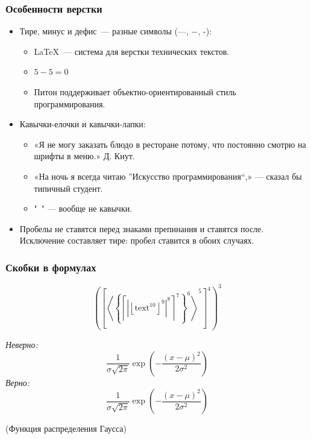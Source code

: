 \documentclass{beamer}
\begin{document}
\begin{frame}
  \frametitle{Особенности верстки}

  \begin{itemize}  
  \item Тире, минус и дефис~— разные символы (—, $-$, -):
    \begin{itemize}
    \item \LaTeX~— система для верстки технических текстов.
    \item $5 - 5 = 0$
    \item Питон поддерживает объектно-ориентированный стиль программирования.
    \end{itemize}
  \item Кавычки-елочки и кавычки-лапки:
    \begin{itemize}
    \item «Я не могу заказать блюдо в ресторане потому, что постоянно смотрю на шрифты в меню.» Д. Кнут.
    \item «На ночь я всегда читаю ''Искусство программирования``,» — сказал бы типичный студент.
    \item "\ " — вообще не кавычки.
    \end{itemize}
  \item Пробелы не ставятся перед знаками препинания и ставятся после. Исключение составляет тире: пробел ставится в обоих случаях.
  \end{itemize}
\end{frame}

\begin{frame}
  \frametitle{Скобки в формулах}

      $$
      \left(
       \left[
        \left\langle
         \left\{
           \left\lceil
            \left|
             \left\lfloor
              \text{text}^{10}
             \right\rfloor^9
            \right|^8
           \right\rceil^7
         \right\}^6
        \right\rangle^5
       \right]^4
      \right)^3
      $$
    
      {\it Неверно:}
      $$
      \frac{1}{\sigma \sqrt{2 \pi}} \exp( - \frac{( x - \mu ) ^ 2}{2 \sigma ^ 2} )
      $$
      {\it Верно:}
      $$
      \frac{1}{\sigma \sqrt{2 \pi}} \exp\left( - \frac{\left( x - \mu \right) ^ 2}{2 \sigma ^ 2} \right)
      $$
      
          \begin{center}{\small(Функция распределения Гаусса)}\end{center}

\end{frame}
\end{document}
